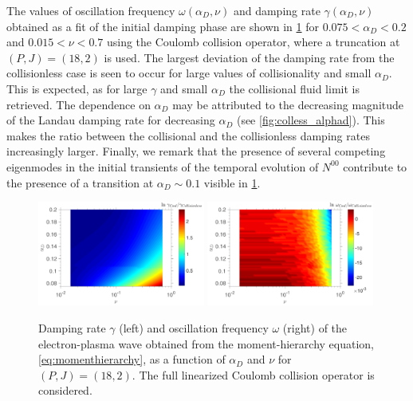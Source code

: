 The values of {oscillation frequency} $\omega(\alpha_D,\nu)$ and {damping rate} $\gamma(\alpha_D,\nu)$ obtained as a fit of the initial damping phase {are} shown in \cref{fig:momhiersol} for {$0.075<\alpha_D<0.2$ and $0.015<\nu<0.7$} using the Coulomb collision operator, where a truncation at $(P,J)=(18,2)$ is used.
%
The largest deviation of the damping rate from the collisionless {case} is seen to occur for large values of collisionality and small $\alpha_D$. This is expected, as for large $\gamma$ and small $\alpha_D$ the collisional fluid limit is retrieved.
%
{The dependence on $\alpha_D$} may be attributed to the decreasing magnitude of the Landau damping rate for decreasing $\alpha_D$ (see \cref{fig:colless_alphad}).
%
This makes the ratio between the collisional and the collisionless damping rates increasingly larger.
%
{Finally, we remark that the presence of several competing eigenmodes in the {initial transients of the} temporal evolution of $N^{00}$ contribute to the presence of a transition at $\alpha_D \sim 0.1$ visible in \cref{fig:momhiersol}.}

\begin{figure}
    \centering
    \includegraphics[width=0.49\textwidth]{images/Coul_gamma_nu_alphaD_pmax18_jmax2.pdf}
    \includegraphics[width=0.49\textwidth]{images/Coul_omega_nu_alphaD_pmax18_jmax2.pdf}
    \caption{Damping rate $\gamma$ (left) and oscillation frequency $\omega$ (right) of the electron-plasma wave obtained from the moment-hierarchy equation, \cref{eq:momenthierarchy}, as a function of $\alpha_D$ and $\nu$ for $(P,J)=(18,2)$.
    {The full linearized Coulomb collision operator is considered.}}
    \label{fig:momhiersol}
\end{figure}


